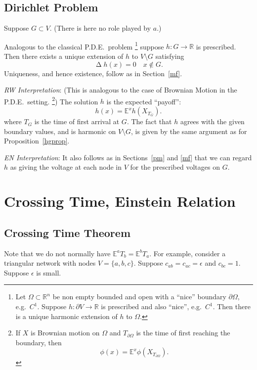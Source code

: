 \documentclass[a4paper]{amsart}
\theoremstyle{plain}
\theoremstyle{definition}
\theoremstyle{remark}
\DeclareMathOperator{\lap}{\Delta}
\begin{document}
\subsection{Dirichlet Problem}  Suppose $ G \subset  V $.  (There is here no role played by $ a $.)

Analogous to the classical P.D.E.\ problem%
\footnote{\label{char}Let $ \Omega \subset \mathbb{R}^n $ be  non empty bounded and open with a ``nice'' boundary 
$ \partial \Omega $, e.g.\ $ C^1 $.  
Suppose $h : \partial V \to \mathbb{R}   $ is prescribed and also ``nice'', e.g.\ $ C^1 $.  Then there is a unique harmonic extension of $ h $ to $ \Omega $.   
}
suppose $  h : G \to \mathbb{R}   $ is prescribed.  Then there exists a unique extension of $ h $ to $ V\setminus  G $ satisfying
\begin{equation} \label{}
\lap h(x) = 0  \quad x \notin G .
\end{equation}
Uniqueness, and hence existence, follow as in Section~\ref{mf}.

\medskip
\emph{RW Interpretation}:  (This is analogous to the case of Brownian Motion in the P.D.E.\ setting.%
\footnote{If $ X $ is Brownian motion on $ \Omega $ and $ T_{\partial \Omega} $ is the time of first reaching the boundary, then 
\[
\phi(x) = \mathbb{E}^x \phi(X_{T_{\partial \Omega}}).
\]
})
The solution 
 $ h $   is the expected ``payoff'':
\begin{equation} \label{harw}
 \boxed{h(x) =  \mathbb{E}^xh(X_{T_G} ) .}
\end{equation} 
 where $ {T_G} $ is the time of first arrival at $G $.
 The fact that $ h $ agrees with the given boundary values, and is harmonic   on $V\setminus G $, is given by the same argument as for Proposition~\ref{hgprop}.
 
\medskip \emph{EN Interpretation}:
 It also follows as in Sections~\ref{pm} and \ref{mf} that we can regard $ h $ as giving the voltage  at each node in  $ V $ for  the prescribed voltages on $G $.





\section{\textbf{Crossing Time, Einstein Relation}}
\subsection{Crossing Time Theorem}
Note that we do not normally have $ \mathbb{E}^a T_b = \mathbb{E}^b T_a $.   For example, consider a triangular network with nodes $ V = \{a,b,c\} $.  Suppose   $ c_{ab} = c_{ac} = \epsilon $ and $ c_{bc} = 1 $.  Suppose $ \epsilon $ is small.
\end{document}

